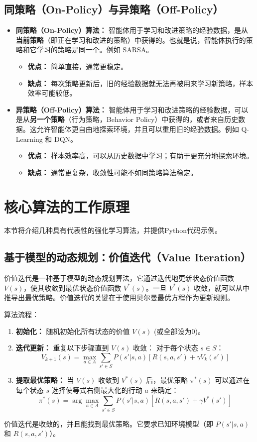 \subsection{同策略（On-Policy）与异策略（Off-Policy）}
\begin{itemize}
    \item \textbf{同策略（On-Policy）算法：} 智能体用于学习和改进策略的经验数据，是从\textbf{当前策略}（即正在学习和改进的策略）中获得的。也就是说，智能体执行的策略和它学习的策略是同一个。例如 SARSA。
        \begin{itemize}
            \item \textbf{优点：} 简单直接，通常更稳定。
            \item \textbf{缺点：} 每次策略更新后，旧的经验数据就无法再被用来学习新策略，样本效率可能较低。
        \end{itemize}
    \item \textbf{异策略（Off-Policy）算法：} 智能体用于学习和改进策略的经验数据，可以是从\textbf{另一个策略}（行为策略，Behavior Policy）中获得的，或者来自历史数据。这允许智能体更自由地探索环境，并且可以重用旧的经验数据。例如 Q-Learning 和 DQN。
        \begin{itemize}
            \item \textbf{优点：} 样本效率高，可以从历史数据中学习；有助于更充分地探索环境。
            \item \textbf{缺点：} 通常更复杂，收敛性可能不如同策略算法稳定。
        \end{itemize}
\end{itemize}

\section{核心算法的工作原理}
本节将介绍几种具有代表性的强化学习算法，并提供Python代码示例。

\subsection{基于模型的动态规划：价值迭代（Value Iteration）}
价值迭代是一种基于模型的动态规划算法，它通过迭代地更新状态价值函数 $V(s)$，使其收敛到最优状态价值函数 $V^*(s)$。一旦 $V^*(s)$ 收敛，就可以从中推导出最优策略。价值迭代的关键在于使用贝尔曼最优方程作为更新规则。

算法流程：
\begin{enumerate}
    \item \textbf{初始化：} 随机初始化所有状态的价值 $V(s)$ (或全部设为0)。
    \item \textbf{迭代更新：} 重复以下步骤直到 $V(s)$ 收敛：
    对于每个状态 $s \in S$：
    $$ V_{k+1}(s) = \max_{a \in A} \sum_{s' \in S} P(s'|s, a) [R(s, a, s') + \gamma V_k(s')] $$
    \item \textbf{提取最优策略：} 当 $V(s)$ 收敛到 $V^*(s)$ 后，最优策略 $\pi^*(s)$ 可以通过在每个状态 $s$ 选择使等式右侧最大化的行动 $a$ 来确定：
    $$ \pi^*(s) = \arg\max_{a \in A} \sum_{s' \in S} P(s'|s, a) [R(s, a, s') + \gamma V^*(s')] $$
\end{enumerate}
价值迭代是收敛的，并且能找到最优策略。它要求已知环境模型（即 $P(s'|s, a)$ 和 $R(s, a, s')$）。


